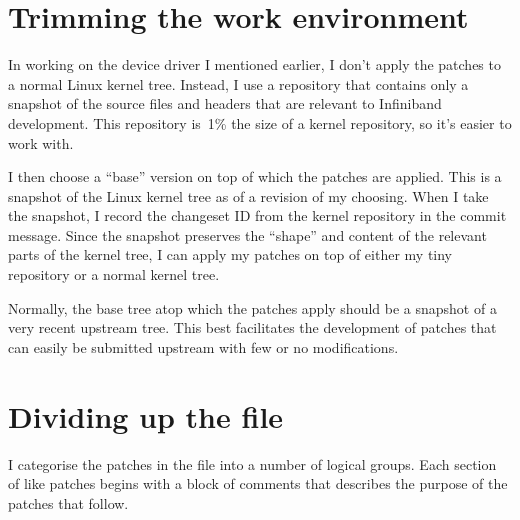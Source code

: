 \section{Trimming the work environment}

In working on the device driver I mentioned earlier, I don't apply the
patches to a normal Linux kernel tree.  Instead, I use a repository
that contains only a snapshot of the source files and headers that are
relevant to Infiniband development.  This repository is~1\% the size
of a kernel repository, so it's easier to work with.

I then choose a ``base'' version on top of which the patches are
applied.  This is a snapshot of the Linux kernel tree as of a revision
of my choosing.  When I take the snapshot, I record the changeset ID
from the kernel repository in the commit message.  Since the snapshot
preserves the ``shape'' and content of the relevant parts of the
kernel tree, I can apply my patches on top of either my tiny
repository or a normal kernel tree.

Normally, the base tree atop which the patches apply should be a
snapshot of a very recent upstream tree.  This best facilitates the
development of patches that can easily be submitted upstream with few
or no modifications.

\section{Dividing up the  file}

I categorise the patches in the  file into a number
of logical groups.  Each section of like patches begins with a block
of comments that describes the purpose of the patches that follow.

